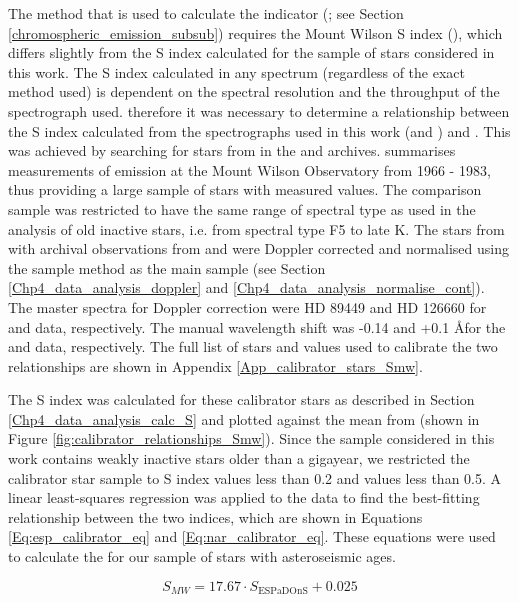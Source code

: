 The method that is used to calculate the \Rprime indicator (\citealt{Noyes_etal_1984}; see Section \ref{chromospheric_emission_subsub}) requires the Mount Wilson S index (\Smw), which differs slightly from the S index calculated for the sample of stars considered in this work. The S index calculated in any spectrum (regardless of the exact method used) is dependent on the spectral resolution and the throughput of the spectrograph used. therefore it was necessary to determine a relationship between the S index calculated from the spectrographs used in this work (\esp and \narval) and \Smw. This was achieved by searching for stars from \citet{Duncan_etal_1991} in the \esp and \narval archives. \citet{Duncan_etal_1991} summarises measurements of \caII emission at the Mount Wilson Observatory from 1966 - 1983, thus providing a large sample of stars with measured \Smw values. The comparison sample was restricted to have the same range of spectral type as used in the analysis of old inactive stars, i.e. from spectral type F5 to late K. The stars from \citet{Duncan_etal_1991} with archival observations from \esp and \narval were Doppler corrected and normalised using the sample method as the main sample (see Section \ref{Chp4_data_analysis_doppler} and \ref{Chp4_data_analysis_normalise_cont}). The master spectra for Doppler correction were HD 89449 and HD 126660 for \esp and \narval data, respectively. The manual wavelength shift was -0.14 and +0.1 \AA \space for the \esp and \narval data, respectively. The full list of stars and values used to calibrate the two relationships are shown in Appendix \ref{App_calibrator_stars_Smw}.

The S index was calculated for these calibrator stars as described in Section \ref{Chp4_data_analysis_calc_S} and plotted against the mean \Smw from \citet{Duncan_etal_1991} (shown in Figure \ref{fig:calibrator_relationships_Smw}). Since the sample considered in this work contains weakly inactive stars older than a gigayear, we restricted the calibrator star sample to S index values less than 0.2 and \Smw values less than 0.5. A linear least-squares regression was applied to the data to find the best-fitting relationship between the two indices, which are shown in Equations \ref{Eq:esp_calibrator_eq} and \ref{Eq:nar_calibrator_eq}. These equations were used to calculate the \Smw for our sample of stars with asteroseismic ages.

\begin{equation}
S_{MW} = 17.67 \cdot S_{\mathrm{ESPaDOnS}}+ 0.025
\label{Eq:esp_calibrator_eq}
\end{equation}

